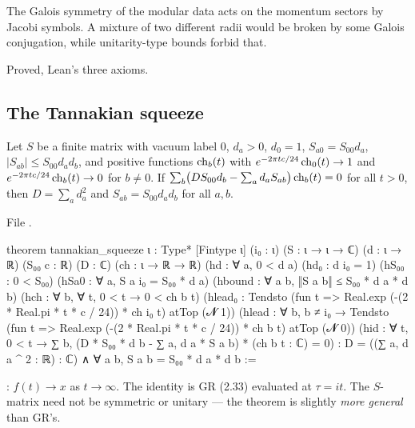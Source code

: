 \begin{physics}
The Galois symmetry of the modular data acts on the momentum sectors by Jacobi symbols. A mixture of two
different radii would be broken by some Galois conjugation, while unitarity-type bounds forbid that.
\end{physics}

\begin{status}
Proved, Lean's three axioms.
\end{status}

\subsection{The Tannakian squeeze}

\begin{theorem}\label{l22:thm:squeeze}
Let $S$ be a finite matrix with vacuum label $0$, $d_a>0$, $d_0=1$, $S_{a0}=S_{00}d_a$, $|S_{ab}|\le S_{00}d_ad_b$, and
positive functions $\operatorname{ch}_b(t)$ with $e^{-2\pi tc/24}\operatorname{ch}_0(t)\to1$ and $e^{-2\pi tc/24}\operatorname{ch}_b(t)\to0$ for
$b\ne0$. If $\sum_b\bigl(DS_{00}d_b-\sum_ad_aS_{ab}\bigr)\operatorname{ch}_b(t)=0$ for all $t>0$, then $D=\sum_ad_a^2$ and
$S_{ab}=S_{00}d_ad_b$ for all $a,b$.
\end{theorem}
\noindent File .
\begin{leancode}
theorem tannakian_squeeze {ι : Type*} [Fintype ι] (i₀ : ι) (S : ι → ι → ℂ)
    (d : ι → ℝ) (S₀₀ c : ℝ) (D : ℂ) (ch : ι → ℝ → ℝ)
    (hd : ∀ a, 0 < d a) (hd₀ : d i₀ = 1) (hS₀₀ : 0 < S₀₀)
    (hSa0 : ∀ a, S a i₀ = S₀₀ * d a)
    (hbound : ∀ a b, ‖S a b‖ ≤ S₀₀ * d a * d b)
    (hch : ∀ b, ∀ t, 0 < t → 0 < ch b t)
    (hlead₀ : Tendsto (fun t => Real.exp (-(2 * Real.pi * t * c / 24)) * ch i₀ t) atTop (𝓝 1))
    (hlead : ∀ b, b ≠ i₀ →
      Tendsto (fun t => Real.exp (-(2 * Real.pi * t * c / 24)) * ch b t) atTop (𝓝 0))
    (hid : ∀ t, 0 < t →
      ∑ b, (D * S₀₀ * d b - ∑ a, d a * S a b) * (ch b t : ℂ) = 0) :
    D = ((∑ a, d a ^ 2 : ℝ) : ℂ) ∧ ∀ a b, S a b = S₀₀ * d a * d b :=
\end{leancode}

\begin{dictionary}
: $f(t)\to x$ as $t\to\infty$. The identity  is GR (2.33) evaluated at
$\tau=it$. The $S$-matrix need not be symmetric or unitary --- the theorem is slightly \emph{more general} than
GR's.
\end{dictionary}

